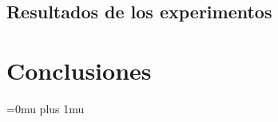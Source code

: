 \documentclass[conference]{IEEEtran}
\begin{document}
    
    
    
    \subsection{Resultados de los experimentos}
    
        
    




\section{Conclusiones} \label{sec:conclusiones}
    
	




\Urlmuskip=0mu plus 1mu\relax

\nocite{*}


\end{document}
